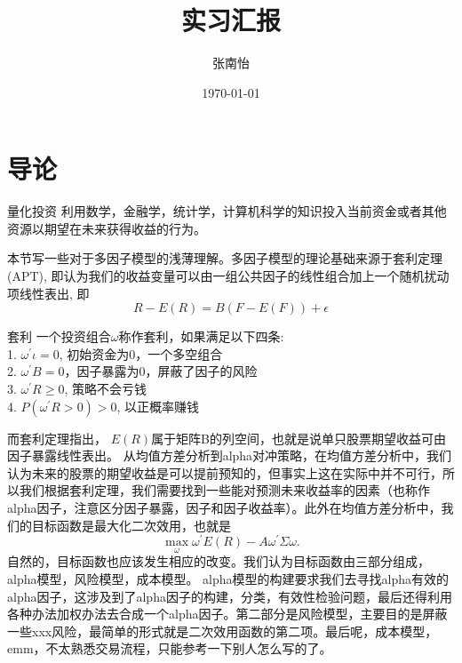 \documentclass[12pt]{article}
\begin{document}
	\title{实习汇报}
	\author{张南怡}
	\date{\today}
	\maketitle
	\tableofcontents
	\listoffigures
\newpage

\section{导论}
\begin{sdefinition}{量化投资}{}
利用数学，金融学，统计学，计算机科学的知识投入当前资金或者其他资源以期望在未来获得收益的行为。
\end{sdefinition}

本节写一些对于多因子模型的浅薄理解。多因子模型的理论基础来源于套利定理(APT), 即认为我们的收益变量可以由一组公共因子的线性组合加上一个随机扰动项线性表出, 即
$$
R-E(R) = B(F-E(F)) + \epsilon
$$
\begin{sdefinition}{套利}{}
一个投资组合$\omega$称作套利，如果满足以下四条: \\
1. $\omega^\prime \iota=0$, 初始资金为0，一个多空组合 \\
2. $\omega^\prime B=0$，因子暴露为0，屏蔽了因子的风险 \\
3. $\omega^\prime R\geq 0$, 策略不会亏钱 \\
4. $P(\omega^\prime R >0)>0$, 以正概率赚钱
\end{sdefinition}
而套利定理指出，
$E(R)$属于矩阵B的列空间，也就是说单只股票期望收益可由因子暴露线性表出。
从均值方差分析到alpha对冲策略，在均值方差分析中，我们认为未来的股票的期望收益是可以提前预知的，但事实上这在实际中并不可行，所以我们根据套利定理，我们需要找到一些能对预测未来收益率的因素（也称作alpha因子，注意区分因子暴露，因子和因子收益率）。此外在均值方差分析中，我们的目标函数是最大化二次效用，也就是
$$
\max_{\omega} \omega^\prime E(R) - A\omega^\prime \Sigma \omega.
$$
自然的，目标函数也应该发生相应的改变。我们认为目标函数由三部分组成，alpha模型，风险模型，成本模型。
alpha模型的构建要求我们去寻找alpha有效的alpha因子，这涉及到了alpha因子的构建，分类，有效性检验问题，最后还得利用各种办法加权办法去合成一个alpha因子。第二部分是风险模型，主要目的是屏蔽一些xxx风险，最简单的形式就是二次效用函数的第二项。最后呢，成本模型，emm，不太熟悉交易流程，只能参考一下别人怎么写的了。
\end{document}
